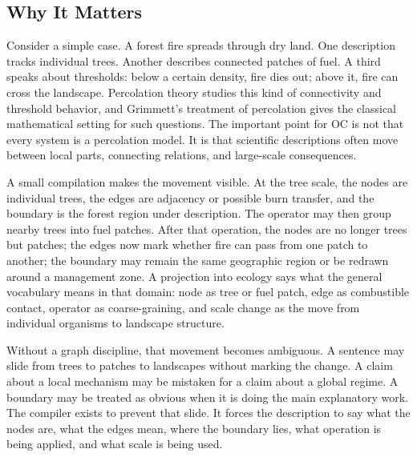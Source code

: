 \documentclass[11pt,a4paper,openany]{book}
\begin{document}
\subsection{Why It Matters}
Consider a simple case. A forest fire spreads through dry land. One description tracks individual trees. Another describes connected patches of fuel. A third speaks about thresholds: below a certain density, fire dies out; above it, fire can cross the landscape. Percolation theory studies this kind of connectivity and threshold behavior, and Grimmett's treatment of percolation gives the classical mathematical setting for such questions. The important point for OC is not that every system is a percolation model. It is that scientific descriptions often move between local parts, connecting relations, and large-scale consequences. \cite{grimmett_percolation,goldenfeld_lectures}\par
A small compilation makes the movement visible. At the tree scale, the nodes are individual trees, the edges are adjacency or possible burn transfer, and the boundary is the forest region under description. The operator may then group nearby trees into fuel patches. After that operation, the nodes are no longer trees but patches; the edges now mark whether fire can pass from one patch to another; the boundary may remain the same geographic region or be redrawn around a management zone. A projection into ecology says what the general vocabulary means in that domain: node as tree or fuel patch, edge as combustible contact, operator as coarse-graining, and scale change as the move from individual organisms to landscape structure.\par
Without a graph discipline, that movement becomes ambiguous. A sentence may slide from trees to patches to landscapes without marking the change. A claim about a local mechanism may be mistaken for a claim about a global regime. A boundary may be treated as obvious when it is doing the main explanatory work. The compiler exists to prevent that slide. It forces the description to say what the nodes are, what the edges mean, where the boundary lies, what operation is being applied, and what scale is being used.\par
\end{document}
